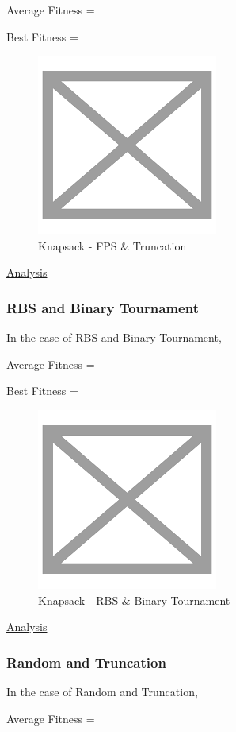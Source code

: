 \documentclass[11pt, letterpaper]{article}
\begin{document}
Average Fitness = 

Best Fitness = 
\begin{figure}[H]
    \centering
    \includegraphics[scale = 0.6]{images/placeHolder.png}
    \caption {Knapsack - FPS \& Truncation}
    \label {fig:gcFT}
\end{figure}

\underline{Analysis}
\subsubsection {RBS and Binary Tournament}
In the case of RBS and Binary Tournament,

Average Fitness = 

Best Fitness = 
\begin{figure}[H]
    \centering
    \includegraphics[scale = 0.6]{images/placeHolder.png}
    \caption {Knapsack - RBS \& Binary Tournament}
    \label {fig:gcRB}
\end{figure}

\underline{Analysis}
\subsubsection {Random and Truncation}
In the case of Random and Truncation,

Average Fitness = 
\end{document}
